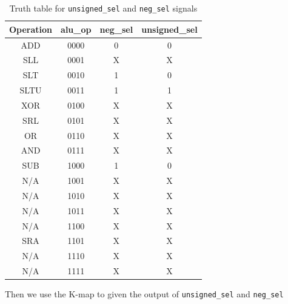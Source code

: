 \documentclass[12pt,a4paper,oneside]{book} %
\begin{document}
\begin{table}[H]
\centering
\caption{Truth table for \texttt{unsigned\_sel} and \texttt{neg\_sel} signals}
\label{alu}
\begin{tabular}{|c|c|c|c|}
\hline
\textbf{Operation} & \textbf{alu\_op} & \textbf{neg\_sel} & \textbf{unsigned\_sel} \\ \hline
ADD                & 0000          & 0                & 0                     \\ \hline
SLL                & 0001          & X                & X                     \\ \hline
SLT                & 0010          & 1                & 0                     \\ \hline
SLTU               & 0011          & 1                & 1                     \\ \hline
XOR                & 0100          & X                & X                     \\ \hline
SRL                & 0101          & X                & X                     \\ \hline
OR                 & 0110          & X                & X                     \\ \hline
AND                & 0111          & X                & X                     \\ \hline
SUB                & 1000          & 1                & 0                     \\ \hline
N/A                & 1001          & X                & X                     \\ \hline
N/A                & 1010          & X                & X                     \\ \hline
N/A                & 1011          & X                & X                     \\ \hline
N/A                & 1100          & X                & X                     \\ \hline
SRA                & 1101          & X                & X                     \\ \hline
N/A                & 1110          & X                & X                     \\ \hline
N/A                & 1111          & X                & X                     \\ \hline
\end{tabular}
\end{table}

Then we use the K-map to given the output of \texttt{unsigned\_sel} and \texttt{neg\_sel}
\end{document}
